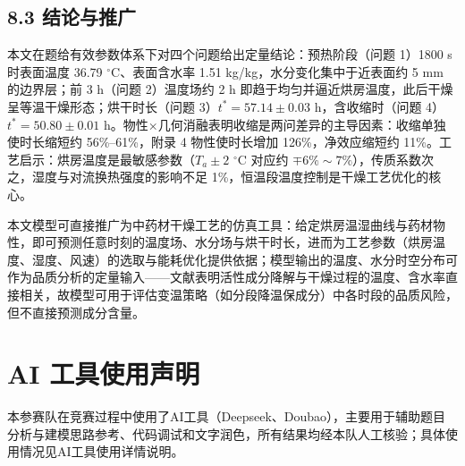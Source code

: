 \documentclass[12pt,a4paper]{ctexart}
\begin{document}
\subsection{8.3 结论与推广}

本文在题给有效参数体系下对四个问题给出定量结论：预热阶段（问题 1）1800 s 时表面温度 36.79 $^\circ$C、表面含水率 1.51 kg/kg，水分变化集中于近表面约 5 mm 的边界层；前 3 h（问题 2）温度场约 2 h 即趋于均匀并逼近烘房温度，此后干燥呈等温干燥形态；烘干时长（问题 3）$t^*=57.14\pm0.03$ h，含收缩时（问题 4）$t^*=50.80\pm0.01$ h。物性×几何消融表明收缩是两问差异的主导因素：收缩单独使时长缩短约 56\%--61\%，附录 4 物性使时长增加 126\%，净效应缩短约 11\%。工艺启示：烘房温度是最敏感参数（$T_a\pm2$ $^\circ$C 对应约 $\mp6\%\sim7\%$），传质系数次之，湿度与对流换热强度的影响不足 1\%，恒温段温度控制是干燥工艺优化的核心。

本文模型可直接推广为中药材干燥工艺的仿真工具：给定烘房温湿曲线与药材物性，即可预测任意时刻的温度场、水分场与烘干时长，进而为工艺参数（烘房温度、湿度、风速）的选取与能耗优化提供依据；模型输出的温度、水分时空分布可作为品质分析的定量输入——文献表明活性成分降解与干燥过程的温度、含水率直接相关\cite{ren}，故模型可用于评估变温策略（如分段降温保成分）中各时段的品质风险，但不直接预测成分含量。

\section*{AI 工具使用声明}

\noindent 本参赛队在竞赛过程中使用了AI工具（Deepseek、Doubao），主要用于辅助题目分析与建模思路参考、代码调试和文字润色，所有结果均经本队人工核验；具体使用情况见AI工具使用详情说明。
\end{document}
